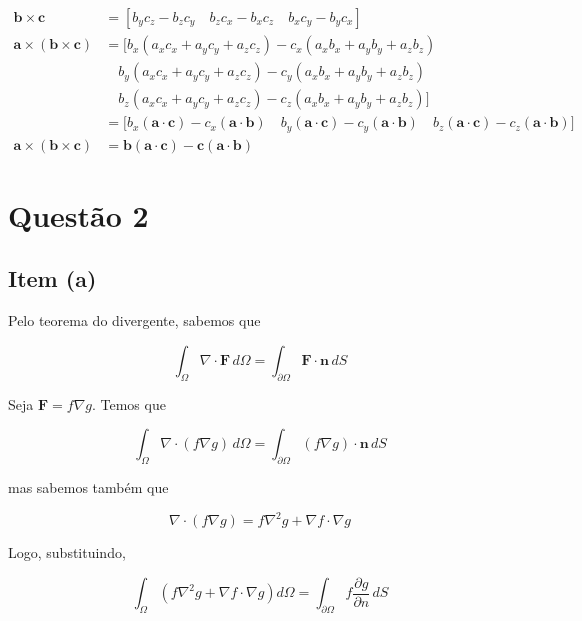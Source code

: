 \begin{footnotesize}
\begin{align*}
\mathbf{b} \times \mathbf{c}
&=
\left[
b_y c_z - b_z c_y  \quad
b_z c_x - b_x c_z  \quad
b_x c_y - b_y c_x
\right]
\\[6pt]
\mathbf{a} \times (\mathbf{b} \times \mathbf{c})
&= \Big[
    b_x(a_x c_x + a_y c_y + a_z c_z) - c_x(a_x b_x + a_y b_y + a_z b_z) \\ & \quad
    b_y(a_x c_x + a_y c_y + a_z c_z) - c_y(a_x b_x + a_y b_y + a_z b_z) \\ & \quad
    b_z(a_x c_x + a_y c_y + a_z c_z) - c_z(a_x b_x + a_y b_y + a_z b_z)
 \Big]
\\[6pt]
&= \Big[
    b_x(\mathbf{a} \cdot \mathbf{c}) - c_x(\mathbf{a} \cdot \mathbf{b}) \quad
    b_y(\mathbf{a} \cdot \mathbf{c}) - c_y(\mathbf{a} \cdot \mathbf{b}) \quad
    b_z(\mathbf{a} \cdot \mathbf{c}) - c_z(\mathbf{a} \cdot \mathbf{b})
 \Big]
\\[6pt]
\mathbf{a} \times (\mathbf{b} \times \mathbf{c})
&=
\mathbf{b}\left(\mathbf{a} \cdot \mathbf{c}\right) - \mathbf{c}\left(\mathbf{a} \cdot \mathbf{b}\right)
\end{align*}
\end{footnotesize}

\chapter{Questão 2}\label{cap:q2}

\section{Item (a)}

Pelo teorema do divergente, sabemos que

\[
\int_{\Omega} \nabla \cdot \mathbf{F} \, d\Omega = \int_{\partial \Omega} \mathbf{F} \cdot \mathbf{n} \, dS
\]

Seja $\mathbf{F} = f \nabla g$. Temos que 

\[
\int_{\Omega} \nabla \cdot (f \nabla g)\, d\Omega
= \int_{\partial \Omega} (f \nabla g) \cdot \mathbf{n}\, dS
\]

\noindent mas sabemos também que 

\[
\nabla \cdot (f \nabla g) = f \nabla^2 g + \nabla f \cdot \nabla g
\]

Logo, substituindo,

\[
\int_{\Omega} \left( f \nabla^2 g + \nabla f \cdot \nabla g \right) d\Omega
= \int_{\partial \Omega} f \frac{\partial g}{\partial n} \, dS
\]

